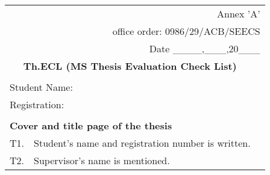\begin{table}[!ht]
\footnotesize
\begin{adjustbox}{width=\linewidth,center}
\begin{tabular}{p{0.6cm}p{9cm}p{0.6cm}}
\multicolumn{3}{r}{Annex 'A'}                                                                                                                                                            \\
\multicolumn{3}{r}{office order: 0986/29/ACB/SEECS}                                                                                                                                      \\
\multicolumn{3}{r}{Date \_\_\_\_,\_\_\_,20\_\_\_}                                                                                                                                        \\
\multicolumn{2}{c}{\textbf{Th.ECL (MS Thesis   Evaluation Check List)}}                                                                                          &                       \\
                          &                                                                                                                                      &                       \\ \midrule
\multicolumn{3}{|l|}{Student  Name:}                                                                                                                                                     \\ \midrule
\multicolumn{3}{|l|}{Registration:}                                                                                                                                                      \\ \midrule
                          &                                                                                                                                      &                       \\ \midrule
\multicolumn{3}{|l|}{\textbf{Cover and title   page of the thesis}}                                                                                                                      \\ \midrule
\multicolumn{1}{|l|}{T1.} & \multicolumn{1}{l|}{Student's name and registration   number is written.}                                                            & \multicolumn{1}{l|}{} \\ \midrule
\multicolumn{1}{|l|}{T2.} & \multicolumn{1}{l|}{Supervisor's name is   mentioned.}                                                                               & \multicolumn{1}{l|}{} \\ \midrule

\end{tabular}
\end{adjustbox}
\end{table}
